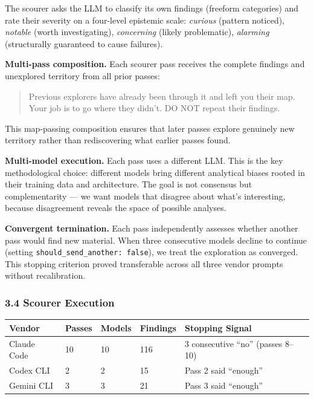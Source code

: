 \documentclass[
]{article}
\begin{document}
The scourer asks the LLM to classify its own findings (freeform
categories) and rate their severity on a four-level epistemic scale:
\emph{curious} (pattern noticed), \emph{notable} (worth investigating),
\emph{concerning} (likely problematic), \emph{alarming} (structurally
guaranteed to cause failures).

\textbf{Multi-pass composition.} Each scourer pass receives the complete
findings and unexplored territory from all prior passes:

\begin{quote}
Previous explorers have already been through it and left you their map.
Your job is to go where they didn't. DO NOT repeat their findings.
\end{quote}

This map-passing composition ensures that later passes explore genuinely
new territory rather than rediscovering what earlier passes found.

\textbf{Multi-model execution.} Each pass uses a different LLM. This is
the key methodological choice: different models bring different
analytical biases rooted in their training data and architecture. The
goal is not consensus but complementarity --- we want models that
disagree about what's interesting, because disagreement reveals the
space of possible analyses.

\textbf{Convergent termination.} Each pass independently assesses
whether another pass would find new material. When three consecutive
models decline to continue (setting
\texttt{should\_send\_another:\ false}), we treat the exploration as
converged. This stopping criterion proved transferable across all three
vendor prompts without recalibration.

\hypertarget{scourer-execution}{%
\subsubsection{3.4 Scourer Execution}\label{scourer-execution}}

\begin{longtable}[]{@{}lllll@{}}
\toprule\noalign{}
Vendor & Passes & Models & Findings & Stopping Signal \\
\midrule\noalign{}
\endhead
\bottomrule\noalign{}
\endlastfoot
Claude Code & 10 & 10 & 116 & 3 consecutive ``no'' (passes 8--10) \\
Codex CLI & 2 & 2 & 15 & Pass 2 said ``enough'' \\
Gemini CLI & 3 & 3 & 21 & Pass 3 said ``enough'' \\
\end{longtable}
\end{document}
